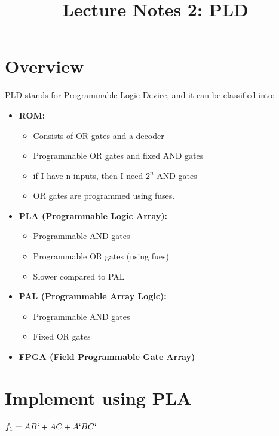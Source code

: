 \documentclass[12 pt]{article}
\title{\huge{Lecture Notes 2: PLD}}
\author{}
\date{}
\begin{document}
\maketitle
\tableofcontents
\newpage

\section{Overview}
PLD stands for Programmable Logic Device, and it can be classified into:
\begin{itemize}
    \item \textbf{ROM:} \begin{itemize}
        \item Consists of OR gates and a decoder
        \item Programmable OR gates and fixed AND gates
        \item if I have n inputs, then I need $2^n$ AND gates
        \item OR gates are programmed using fuses.
    \end{itemize}
    \item \textbf{PLA (Programmable Logic Array):}\begin{itemize}
        \item Programmable AND gates
        \item Programmable OR gates (using fues)
        \item Slower compared to PAL
    \end{itemize} 
    \item \textbf{PAL (Programmable Array Logic):}\begin{itemize}
        \item Programmable AND gates
        \item Fixed OR gates
    \end{itemize}
    \item \textbf{FPGA (Field Programmable Gate Array)}
\end{itemize}
\section{Implement using PLA}
$f_1=AB`+AC+A`BC`$
\end{document}
